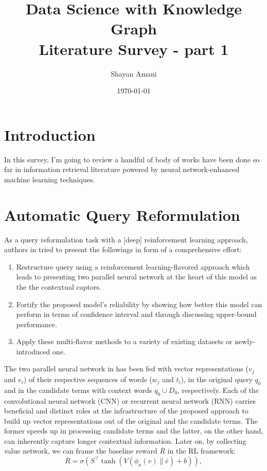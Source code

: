 \documentclass[letterpaper,12pt]{article}
\title{Data Science with Knowledge Graph \\{\large Literature Survey - part 1}}
\author{Shayan Amani}
\date{\today}
\begin{document}
\maketitle

\section{Introduction}
In this survey, I'm going to review a handful of body of works have been done so far in information retrieval literature powered by neural network-enhanced machine learning techniques.


\section{Automatic Query Reformulation}
As a query reformulation task with a [deep] reinforcement learning approach, authors in \cite{Nogueira2017} tried to present the followings in form of a comprehensive effort:
\begin{enumerate}
    \item Restructure query using a reinforcement learning-flavored approach which leads to presenting two parallel neural network at the heart of this model as the the contextual captors.
    \item Fortify the proposed model's reliability by showing how better this model can perform in terms of confidence interval and through discussing upper-bound performance.
    \item Apply these multi-flavor methods to a variety of existing datasets or newly-introduced one.
\end{enumerate}

The two parallel neural network in \cite{Nogueira2017} has been fed with vector representations ($v_j$ and $e_i$) of their respective sequences of words ($w_j$ and $t_i$), in the original query $q_0$ and in the candidate terms with context words $q_0 \cup D_0$, respectively. Each of the convolutional neural network (CNN) or recurrent neural network (RNN) carries beneficial and distinct roles at the infrastructure of the proposed approach to build up vector representations out of the original and the candidate terms. The former speeds up in processing candidate terms and the latter, on the other hand, can inherently capture longer contextual information. Later on, by collecting value network, we can frame the baseline reward $\bar{R}$ in the RL framework:
\begin{equation}
    \overline { R } = \sigma \left( S ^ { \top } \tanh \left( V \left( \phi _ { a } ( v ) \| \overline { e } \right) + b \right) \right),
\end{equation}
\end{document}

